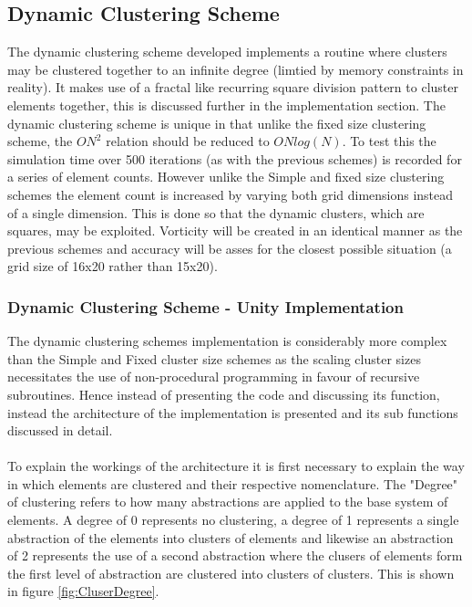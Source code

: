\subsection{Dynamic Clustering Scheme}
The dynamic clustering scheme developed implements a routine where clusters may be clustered together to an infinite degree (limtied by memory constraints in reality). It makes use of a fractal like recurring square division pattern to cluster elements together, this is discussed further in the implementation section. The dynamic clustering scheme is unique in that unlike the fixed size clustering scheme, the $ON^2$ relation should be reduced to $ONlog(N)$. To test this the simulation time over 500 iterations (as with the previous schemes) is recorded for a series of element counts. However unlike the Simple and fixed size clustering schemes the element count is increased by varying both grid dimensions instead of a single dimension. This is done so that the dynamic clusters, which are squares, may be exploited. Vorticity will be created in an identical manner as the previous schemes and accuracy will be asses for the closest possible situation (a grid size of 16x20 rather than 15x20). 

\subsubsection{Dynamic Clustering Scheme - Unity Implementation}
The dynamic clustering schemes implementation is considerably more complex than the Simple and Fixed cluster size schemes as the scaling cluster sizes necessitates the use of non-procedural programming in favour of recursive subroutines. Hence instead of presenting the code and discussing its function, instead the architecture of the implementation is presented and its sub functions discussed in detail.
\\\\
To explain the workings of the architecture it is first necessary to explain the way in which elements are clustered and their respective nomenclature. The "Degree" of clustering refers to how many abstractions are applied to the base system of elements. A degree of 0 represents no clustering, a degree of 1 represents a single abstraction of the elements into clusters of elements and likewise an abstraction of 2 represents the use of a second abstraction where the clusers of elements form the first level of abstraction are clustered into clusters of clusters. This is shown in figure \ref{fig:CluserDegree}.

